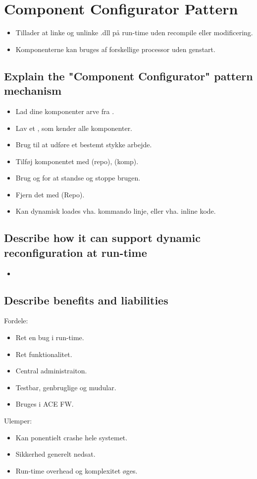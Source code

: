 \documentclass{article}
\begin{document}
\newpage
\section{Component Configurator Pattern}
\begin{itemize}
	\item Tillader at linke og unlinke .dll på run-time uden recompile eller modificering.
	\item Komponenterne kan bruges af forskellige processor uden genstart.
\end{itemize}

\subsection{Explain the "Component Configurator" pattern mechanism}
\begin{itemize}
	\item Lad dine komponenter arve fra .
	\item Lav et , som kender alle komponenter.
	\item Brug  til at udføre et bestemt stykke arbejde.
	\item Tilføj komponentet med  (repo),  (komp).
	\item Brug  og  for at standse og stoppe brugen.
	\item Fjern det med  (Repo).
	\item Kan dynamisk loades vha. kommando linje, eller vha. inline kode.
\end{itemize}


\subsection{Describe how it can support dynamic reconfiguration at run-time}
\begin{itemize}
	\item {}
\end{itemize}


\subsection{Describe benefits and liabilities}

Fordele:
\vspace{-10pt}
\begin{itemize}
	\item Ret en bug i run-time.
	\item Ret funktionalitet.
	\item Central administraiton.
	\item Testbar, genbruglige og mudular.
	\item Bruges i ACE FW.
\end{itemize}

Ulemper:
\vspace{-10pt}
\begin{itemize}
	\item Kan ponentielt crashe hele systemet.
	\item Sikkerhed generelt nedsat.
	\item Run-time overhead og komplexitet øges.
\end{itemize}
\end{document}
